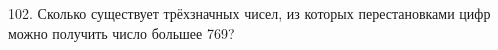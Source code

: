102. Сколько существует трёхзначных чисел, из которых перестановками цифр можно получить число большее 769?
\newpage

